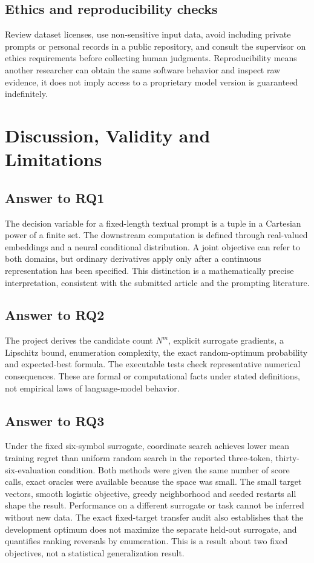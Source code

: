 \documentclass[12pt,a4paper,oneside]{report}
\begin{document}
\section{Ethics and reproducibility checks}
Review dataset licenses, use non-sensitive input data, avoid including private prompts or personal records in a public repository, and consult the supervisor on ethics requirements before collecting human judgments. Reproducibility means another researcher can obtain the same software behavior and inspect raw evidence, it does not imply access to a proprietary model version is guaranteed indefinitely.

\chapter{Discussion, Validity and Limitations}
\section{Answer to RQ1}
The decision variable for a fixed-length textual prompt is a tuple in a Cartesian power of a finite set. The downstream computation is defined through real-valued embeddings and a neural conditional distribution. A joint objective can refer to both domains, but ordinary derivatives apply only after a continuous representation has been specified. This distinction is a mathematically precise interpretation, consistent with the submitted article and the prompting literature.

\section{Answer to RQ2}
The project derives the candidate count $N^m$, explicit surrogate gradients, a Lipschitz bound, enumeration complexity, the exact random-optimum probability and expected-best formula. The executable tests check representative numerical consequences. These are formal or computational facts under stated definitions, not empirical laws of language-model behavior.

\section{Answer to RQ3}
Under the fixed six-symbol surrogate, coordinate search achieves lower mean training regret than uniform random search in the reported three-token, thirty-six-evaluation condition. Both methods were given the same number of score calls, exact oracles were available because the space was small. The small target vectors, smooth logistic objective, greedy neighborhood and seeded restarts all shape the result. Performance on a different surrogate or task cannot be inferred without new data. The exact fixed-target transfer audit also establishes that the development optimum does not maximize the separate held-out surrogate, and quantifies ranking reversals by enumeration. This is a result about two fixed objectives, not a statistical generalization result.
\end{document}
